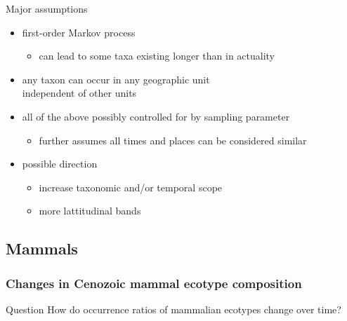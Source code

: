 \documentclass{beamer}
\begin{document}
\begin{frame}
  \begin{block}{Major assumptions}
    \begin{itemize}
      \item first-order Markov process
        \begin{itemize}
          \item can lead to some taxa existing longer than in actuality
        \end{itemize}
      \item any taxon can occur in any geographic unit \\independent of other units
      \item all of the above possibly controlled for by sampling parameter
        \begin{itemize}
          \item further assumes all times and places can be considered similar
        \end{itemize}
      \item possible direction 
        \begin{itemize}
          \item increase taxonomic and/or temporal scope
          \item more lattitudinal bands
        \end{itemize}
    \end{itemize}
  \end{block}
\end{frame}

\subsection{Mammals}
\begin{frame}
  \frametitle{Changes in Cenozoic mammal ecotype composition}

  \begin{alertblock}{Question}
    How do occurrence ratios of mammalian ecotypes change over time?
  \end{alertblock}
\end{frame}
\end{document}
